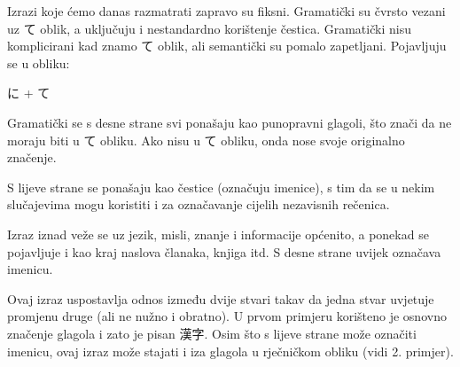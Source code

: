 
\author{Tomislav Mamić}


	
	
	Izrazi koje ćemo danas razmatrati zapravo su fiksni. Gramatički su čvrsto vezani uz て oblik, a uključuju i nestandardno korištenje čestica. Gramatički nisu komplicirani kad znamo て oblik, ali semantički su pomalo zapetljani. Pojavljuju se u obliku:
	
	\hspace{30pt} に + て
	
	Gramatički se s desne strane svi ponašaju kao punopravni glagoli, što znači da ne moraju biti u て obliku. Ako nisu u て obliku, onda nose svoje originalno značenje.
	
	S lijeve strane se ponašaju kao čestice (označuju imenice), s tim da se u nekim slučajevima mogu koristiti i za označavanje cijelih nezavisnih rečenica.
	
	\begin{reibun}
	\end{reibun}
	
	Izraz iznad veže se uz jezik, misli, znanje i informacije općenito, a ponekad se pojavljuje i kao kraj naslova članaka, knjiga itd. S desne strane uvijek označava imenicu.
	
	\begin{reibun}
	\end{reibun}

	Ovaj izraz uspostavlja odnos između dvije stvari takav da jedna stvar uvjetuje promjenu druge (ali ne nužno i obratno). U prvom primjeru korišteno je osnovno značenje glagola i zato je pisan 漢字. Osim što s lijeve strane može označiti imenicu, ovaj izraz može stajati i iza glagola u rječničkom obliku (vidi 2. primjer).
	
